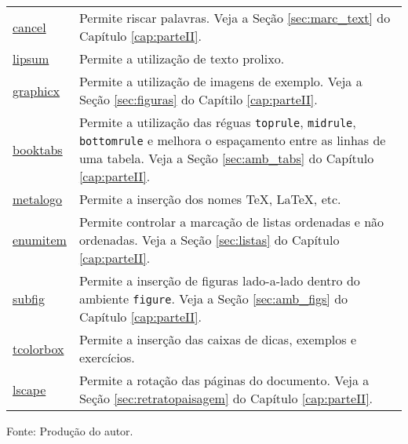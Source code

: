 \begin{longtable}{@{\extracolsep{\fill}}p{2cm} p{12cm}}
\href{https://www.ctan.org/pkg/cancel}{cancel} & Permite riscar palavras. Veja a Seção \ref{sec:marc_text} do Capítulo \ref{cap:parteII}. \\
\href{https://www.ctan.org/pkg/lipsum}{lipsum} & Permite a utilização de texto prolixo. \\
\href{https://www.ctan.org/pkg/graphicx}{graphicx} & Permite a utilização de imagens de exemplo. Veja a Seção \ref{sec:figuras} do Capítilo \ref{cap:parteII}. \\
\href{https://www.ctan.org/pkg/booktabs}{booktabs} & Permite a utilização das réguas {\tt toprule}, {\tt midrule}, {\tt bottomrule} e melhora o espaçamento entre as linhas de uma tabela. Veja a Seção \ref{sec:amb_tabs} do Capítulo \ref{cap:parteII}. \\
\href{https://www.ctan.org/pkg/metalogo}{metalogo} & Permite a inserção dos nomes \TeX{}, \LaTeX{}, \XeLaTeX{} etc. \\
\href{https://www.ctan.org/pkg/enumitem}{enumitem} & Permite controlar a marcação de listas ordenadas e não ordenadas. Veja a Seção \ref{sec:listas} do Capítulo \ref{cap:parteII}. \\
\href{https://www.ctan.org/pkg/subfig}{subfig}  & Permite a inserção de figuras lado-a-lado dentro do ambiente {\tt figure}. Veja a Seção \ref{sec:amb_figs} do Capítulo \ref{cap:parteII}. \\
\href{https://www.ctan.org/pkg/tcolorbox}{tcolorbox} & Permite a inserção das caixas de dicas, exemplos e exercícios. \\
\href{https://www.ctan.org/pkg/lscape}{lscape} & Permite a rotação das páginas do documento. Veja a Seção \ref{sec:retratopaisagem} do Capítulo \ref{cap:parteII}. \\
\end{longtable}
\vspace{-8mm}
\begin{center}
	Fonte: Produção do autor.
\end{center}
